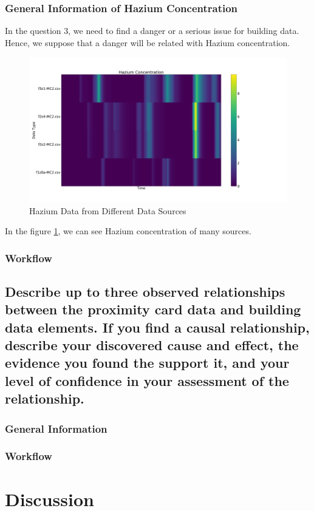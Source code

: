 \documentclass[aps, 10pt, a4paper]{article}
\begin{document}
            \subsubsection{General Information of Hazium Concentration}
                In the question 3, we need to find a danger or a serious issue for building data. Hence, we suppose that a danger will be related with Hazium concentration.
                
                \begin{figure}[htbp]
                    \centering
                    \includegraphics[width=0.4 \linewidth]{figures/hazium.png}
                    \caption{Hazium Data from Different Data Sources}
                    \label{fig:generalhazium}
                \end{figure}
            
                In the figure \ref{fig:generalhazium}, we can see Hazium concentration of many sources. 

            \subsubsection{Workflow}
        
        \subsection[Question 4]{Describe up to three observed relationships between the proximity card data and building data elements. If you find a causal relationship, describe your discovered cause and effect, the evidence you found the support it, and your level of confidence in your assessment of the relationship.}
            \subsubsection{General Information}
            
            \subsubsection{Workflow}
    
    \section{Discussion}
    
    
    
\end{document}
